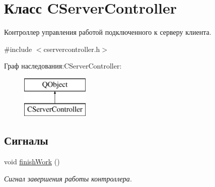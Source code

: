\hypertarget{class_c_server_controller}{}\section{Класс C\+Server\+Controller}
\label{class_c_server_controller}


Контроллер управления работой подключенного к серверу клиента.  




{\ttfamily \#include $<$cservercontroller.\+h$>$}

Граф наследования\+:C\+Server\+Controller\+:\begin{figure}[H]
\begin{center}
\leavevmode
\includegraphics[height=2.000000cm]{class_c_server_controller}
\end{center}
\end{figure}
\subsection*{Сигналы}
\begin{DoxyCompactItemize}
\item 
void \hyperlink{class_c_server_controller_a49ac8bb325430fc9112056d862c5c117}{finish\+Work} ()
\begin{DoxyCompactList}\small\item\em Сигнал завершения работы контроллера. \end{DoxyCompactList}\end{DoxyCompactItemize}
